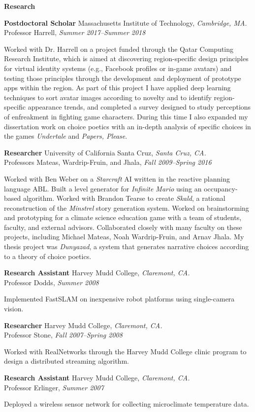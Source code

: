\documentclass[11pt]{article}
\newenvironment{sct}[1]{%
  \vspace{8pt plus 2pt minus 4pt}\textbf{\Large #1} \hrulefill\vspace{6pt}
  \begin{adjustwidth}{6pt}{0pt}
}{%
  \end{adjustwidth}
}
\newcommand{\work}[1]{\textit{#1}\xspace}
\newcommand{\indented}[1]{\hspace*{\fill}\parbox{\textwidth-22pt}{#1}}
\newcommand{\experience}[6]{%
  \textbf{#1} #2, \textit{#3.} \\
  #4, \textit{#5} \\
  \indented{#6}
  \vspace{7pt plus 2pt minus 2pt}
}
\begin{document}
\begin{sct}{Research}

\experience{Postdoctoral Scholar}{Massachusetts Institute of Technology}{Cambridge, MA}%
{Professor Harrell}{Summer 2017--Summer 2018}{
  Worked with Dr. Harrell on a project funded through the Qatar Computing
  Research Institute, which is aimed at discovering region-specific design
  principles for virtual identity systems (e.g., Facebook profiles or in-game
  avatars) and testing those principles through the development and deployment
  of prototype apps within the region. As part of this project I have applied
  deep learning techniques to sort avatar images according to novelty and to
  identify region-specific appearance trends, and completed a survey designed
  to study perceptions of enfreakment in fighting game characters. During this
  time I also expanded my dissertation work on choice poetics with an in-depth
  analysis of specific choices in the games \work{Undertale} and \work{Papers,
  Please}.
}

\experience{Researcher}{University of California Santa Cruz}{Santa Cruz, CA}%
{Professors Mateas, Wardrip-Fruin, and Jhala}{Fall 2009--Spring 2016}{
Worked with Ben Weber on a \work{Starcraft} AI written in the reactive planning
language ABL. Built a level generator for \work{Infinite Mario} using an
occupancy-based algorithm. Worked with Brandon Tearse to create \work{Skald}, a
rational reconstruction of the \work{Minstrel} story generation system. Worked
on brainstorming and prototyping for a climate science education game with a
team of students, faculty, and external advisors. Collaborated closely with
many faculty on these projects, including Michael Mateas, Noah Wardrip-Fruin,
and Arnav Jhala. My thesis project was \work{Dunyazad}, a system that generates
narrative choices according to a theory of choice poetics.
}

\experience{Research Assistant}{Harvey Mudd College}{Claremont, CA}%
{Professor Dodds}{Summer 2008}{
Implemented FastSLAM on inexpensive robot platforms using single-camera vision.
}

\experience{Researcher}{Harvey Mudd College}{Claremont, CA}%
{Professor Stone}{Fall 2007--Spring 2008}{
Worked with RealNetworks through the Harvey Mudd College clinic program to
design a distributed streaming algorithm.
}

\experience{Research Assistant}{Harvey Mudd College}{Claremont, CA}%
{Professor Erlinger}{Summer 2007}{
Deployed a wireless sensor network for collecting microclimate temperature data.
}

\end{sct}
\end{document}
